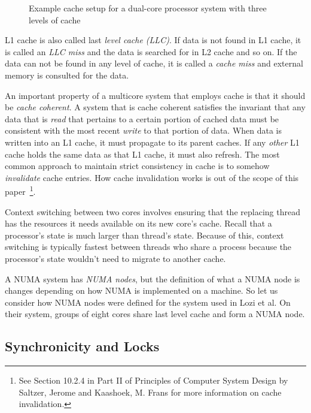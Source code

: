 \documentclass{sig-alternate}
\begin{document}
\begin{figure}
\centering
{}
\caption{Example cache setup for a dual-core processor system with three levels of cache}
\label{fig:cache}
\end{figure}

L1 cache is also called last \emph{level cache (LLC)}. If data is not found in L1 cache, it is called an \emph{LLC miss} and the data is searched for in L2 cache and so on. If the data can not be found in any level of cache, it is called a \emph{cache miss} and external memory is consulted for the data. 

An important property of a multicore system that employs cache is that it should be \emph{cache coherent}. A system that is cache coherent satisfies the invariant that any data that is \emph{read} that pertains to a certain portion of cached data must be consistent with the most recent \emph{write} to that portion of data. When data is written into an L1 cache, it must propagate to its parent caches. If any \emph{other} L1 cache holds the same data as that L1 cache, it must also refresh. The most common approach to maintain strict consistency in cache is to somehow \emph{invalidate} cache entries. How cache invalidation works is out of the scope of this paper~\footnote{See Section 10.2.4 in Part II of Principles of Computer System Design by Saltzer, Jerome and Kaashoek, M. Frans for more information on cache invalidation.}.~\cite{Systems}

Context switching between two cores involves ensuring that the replacing thread has the resources it needs available on its new core's cache. Recall that a processor's state is much larger than thread's state. Because of this, context switching is typically fastest between threads who share a process because the processor's state wouldn't need to migrate to another cache.

A NUMA system has \emph{NUMA nodes}, but the definition of what a NUMA node is changes depending on how NUMA is implemented on a machine. So let us consider how NUMA nodes were defined for the system used in Lozi et al. On their system, groups of eight cores share last level cache and form a NUMA node.

\subsection{Synchronicity and Locks}
\label{sec:locks}
\end{document}

